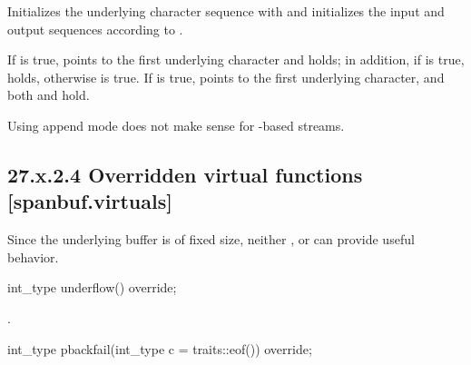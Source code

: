 \documentclass[ebook,11pt,article]{memoir}
\begin{document}
\begin{itemdescr}
\pnum
\effects
Initializes the  underlying character
sequence with  and initializes the input and output sequences according to .

\pnum
\postconditions If  is true,  points to the
first underlying character and   holds; in
addition, if  is true,
holds, otherwise  is true. If  is
true,  points to the first underlying character, and both  and  hold.

\begin{note}
Using append mode does not make sense for -based streams.
\end{note}

\end{itemdescr}

\subsection{27.x.2.4 Overridden virtual functions [spanbuf.virtuals]}
\pnum
\begin{note}
Since the underlying buffer is of fixed size, neither ,  or  can provide useful behavior.
\end{note}

\begin{itemdecl}
int_type underflow() override;
\end{itemdecl}

\begin{itemdescr}
\pnum
\returns
.
\end{itemdescr}

\begin{itemdecl}
int_type pbackfail(int_type c = traits::eof()) override;
\end{itemdecl}
\end{document}
